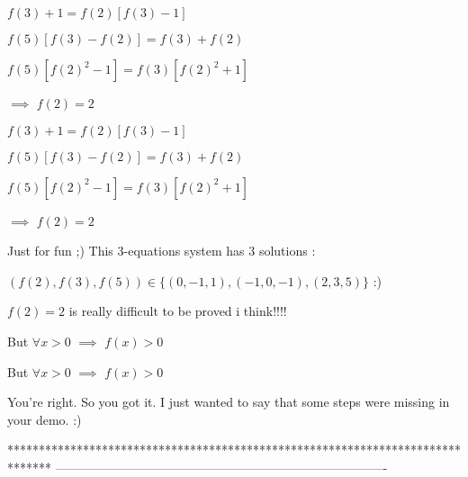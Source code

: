 \begin{solution}
	$ f(3)+1=f(2)[f(3)-1]$

$ f(5)[f(3)-f(2)]=f(3)+f(2)$

$ f(5)[f(2)^{2}-1]=f(3)[f(2)^{2}+1]$

$ \implies$  $ f(2)=2$ 
\end{solution}



\begin{solution}
	\begin{tcolorbox}$ f(3) + 1 = f(2)[f(3) - 1]$

$ f(5)[f(3) - f(2)] = f(3) + f(2)$

$ f(5)[f(2)^{2} - 1] = f(3)[f(2)^{2} + 1]$

$ \implies$  $ f(2) = 2$ \end{tcolorbox}

Just for fun ;) This 3-equations system has 3 solutions :

$ (f(2),f(3),f(5))\in\{(0,-1,1),(-1,0,-1),(2,3,5)\}$ :)
\end{solution}



\begin{solution}
	$ f(2) = 2$ is really difficult to be proved i think!!!!
\end{solution}



\begin{solution}
	But $ \forall x>0$  $ \implies$  $ f(x)>0$
\end{solution}



\begin{solution}
	\begin{tcolorbox}But $ \forall x > 0$  $ \implies$  $ f(x) > 0$\end{tcolorbox}

You're right. So you got it.
I just wanted to say that some steps were missing in your demo. :)
\end{solution}
*******************************************************************************
-------------------------------------------------------------------------------


